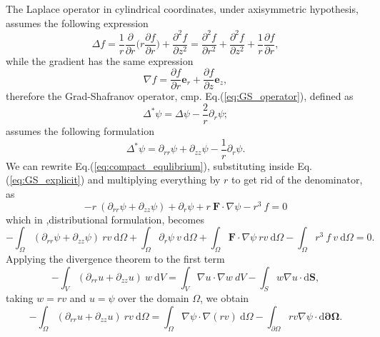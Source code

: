 The Laplace operator in cylindrical coordinates, under axisymmetric hypothesis, assumes the following expression
\begin{equation}\label{eq:laplace_operator}
  \Delta f=\frac{1}{r}\frac{\partial}{\partial r}\bigg(r\frac{\partial f}{\partial r}\bigg)+\frac{\partial^2f}{\partial z^2}=\frac{\partial^2f}{\partial r^2}+\frac{\partial^2f}{\partial z^2}+\frac{1}{r}\frac{\partial f}{\partial r},
\end{equation}
while the gradient has the same expression
\begin{equation}\label{eq:gradient_operator}
  \nabla f=\frac{\partial f}{\partial r}\mathbf{e}_r+\frac{\partial f}{\partial z}\mathbf{e}_z,
\end{equation}
therefore the Grad-Shafranov operator, cmp. Eq.(\ref{eq:GS_operator}), defined as
\begin{equation}
  \Delta^* \psi=\Delta\psi-\frac{2}{r}\partial_r\psi;
\end{equation}
assumes the following formulation
\begin{equation}\label{eq:GS_explicit}
  \Delta^* \psi=\partial_{rr}\psi+\partial_{zz}\psi-\frac{1}{r}\partial_r\psi.
\end{equation}
We can rewrite Eq.(\ref{eq:compact_equlibrium}), substituting inside Eq.(\ref{eq:GS_explicit}) and multiplying  everything by $r$ to get rid of the denominator, as
\begin{equation}\label{eq:compact_equlibrium_bis}
  -r\:(\partial_{rr}\psi+\partial_{zz}\psi)+\partial_r\psi+r\:\mathbf{F}\cdot\nabla\psi-r^3\:f=0
\end{equation}
which in ,distributional formulation, becomes
\begin{equation}\label{eq:compact_equlibrium_var}
  -\int_{\Omega}(\partial_{rr}\psi+\partial_{zz}\psi)\:rv\:\mathrm{d}\Omega + \int_{\Omega}\partial_r\psi\:v\:\mathrm{d}\Omega + \int_{\Omega}\mathbf{F}\cdot\nabla\psi\:rv\:\mathrm{d}\Omega - \int_{\Omega}r^3\:f\:v\:\mathrm{d}\Omega = 0.
\end{equation}
Applying the divergence theorem to the first term
\begin{equation}\label{eq:divergence_theorem}
  -\int_V (\partial_{rr}u+\partial_{zz}u)\:w\:\mathrm{d}V= \int_V \nabla u\cdot\nabla w\mathrm\:{d}V-\int_S w\nabla u\cdot\mathrm{d}\mathbf{S},
\end{equation}
taking $w=rv$ and $u=\psi$ over the domain $\Omega$, we obtain
\begin{equation}\label{eq:weak_GS_second_order_term}
  -\int_{\Omega}(\partial_{rr}u+\partial_{zz}u)\:rv\:\mathrm{d}\Omega=\int_\Omega \nabla\psi \cdot\nabla(rv)\:\mathrm{d}\Omega -\int_{\partial\Omega} rv\nabla \psi\cdot\mathrm{d}\mathbf{\partial\Omega}.
\end{equation}

